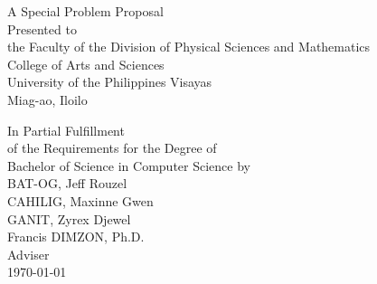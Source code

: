 \begin{titlepage}
\centering


\vspace{1.75cm}
A Special Problem Proposal\\
Presented to\\
the Faculty of the Division of Physical Sciences and Mathematics\\
College of Arts and Sciences\\
University of the Philippines Visayas\\
Miag-ao, Iloilo

\vspace{1.75cm}
In Partial Fulfillment\\
of the Requirements for the Degree of\\
Bachelor of Science in Computer Science
\vspace{1.75cm}
by\\

\vspace{1cm}
BAT-OG, Jeff Rouzel  \\
CAHILIG, Maxinne Gwen  \\
GANIT, Zyrex Djewel  \\

\vspace{1.75cm}
Francis DIMZON, Ph.D. \\
Adviser\\

\vspace{1.75cm}
\today
\end{titlepage}
